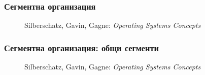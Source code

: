 \documentclass[ignorenonframetext, hyperref=unicode]{beamer}
\begin{document}
\begin{frame}
\frametitle{Сегментна организация}
\begin{figure}[h]
\center
{}
\caption{Silberschatz, Gavin, Gagne: {\em Operating Systems Concepts}}
\end{figure}
\end{frame}

\begin{frame}
\frametitle{Сегментна организация: общи сегменти}
\begin{figure}[h]
\center
{}
\caption{Silberschatz, Gavin, Gagne: {\em Operating Systems Concepts}}
\end{figure}
\end{frame}
\end{document}

